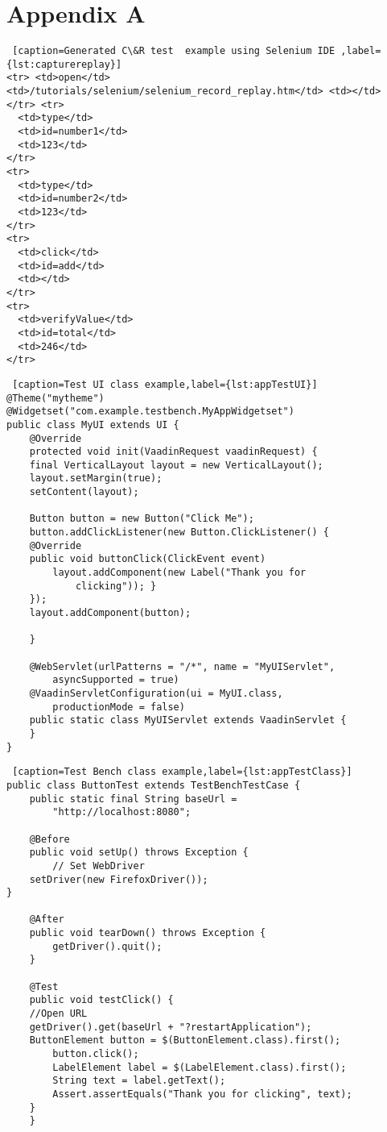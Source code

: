 	
\appendix
\section{Appendix A}
\label{appendixA}

\lstset{style=console}
\begin{lstlisting} [caption=Generated C\&R test  example using Selenium IDE ,label={lst:capturereplay}]
<tr> <td>open</td>
<td>/tutorials/selenium/selenium_record_replay.htm</td> <td></td> </tr> <tr>
  <td>type</td>
  <td>id=number1</td>
  <td>123</td>
</tr>
<tr>
  <td>type</td>
  <td>id=number2</td>
  <td>123</td>
</tr>
<tr>
  <td>click</td>
  <td>id=add</td>
  <td></td>
</tr>
<tr>
  <td>verifyValue</td>
  <td>id=total</td>
  <td>246</td>
</tr>
\end{lstlisting}
	 
\lstset{style=a1listing}
\begin{lstlisting} [caption=Test UI class example,label={lst:appTestUI}]
@Theme("mytheme")
@Widgetset("com.example.testbench.MyAppWidgetset")
public class MyUI extends UI {
	@Override
	protected void init(VaadinRequest vaadinRequest) {
	final VerticalLayout layout = new VerticalLayout();
	layout.setMargin(true);
	setContent(layout);

	Button button = new Button("Click Me");
	button.addClickListener(new Button.ClickListener() {
	@Override
	public void buttonClick(ClickEvent event) 
		layout.addComponent(new Label("Thank you for
			clicking")); }
	});
	layout.addComponent(button);

	}
    
	@WebServlet(urlPatterns = "/*", name = "MyUIServlet",
		asyncSupported = true)
	@VaadinServletConfiguration(ui = MyUI.class,
		productionMode = false)
	public static class MyUIServlet extends VaadinServlet {
	}
}
\end{lstlisting}

\lstset{style=a1listing}
\begin{lstlisting} [caption=Test Bench class example,label={lst:appTestClass}]
public class ButtonTest extends TestBenchTestCase {
	public static final String baseUrl =
		"http://localhost:8080";
    
	@Before
	public void setUp() throws Exception {
		// Set WebDriver
	setDriver(new FirefoxDriver());
}

	@After
	public void tearDown() throws Exception {
		getDriver().quit();
	}
    
	@Test
	public void testClick() {
	//Open URL
	getDriver().get(baseUrl + "?restartApplication");
	ButtonElement button = $(ButtonElement.class).first();
		button.click();
		LabelElement label = $(LabelElement.class).first();
		String text = label.getText();
		Assert.assertEquals("Thank you for clicking", text);
	}
    }
\end{lstlisting}


